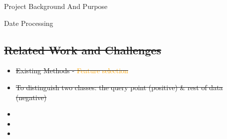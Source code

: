 \documentclass[
 size=14pt,
 paper=smartboard,  %
 mode=present, 		%
 display=slides, 	%
 style=tuliplab,  	%
 pauseslide,
 fleqn,leqno]{powerdot}
\providecommand{\DIFdeltex}[1]{{\protect\color{red}\sout{#1}}}                      %
\providecommand{\DIFdel}[1]{\texorpdfstring{\DIFdeltex{#1}}{}} %
\begin{document}
\begin{slide}
\begin{slide}{Project Background And Purpose}
\begin{slide}{Date Processing}
\begin{note}
\section{\DIFdel{Related Work and Challenges}}
\addtocounter{section}{-1}%

\begin{itemize}%
\item%
\DIFdel{Existing Methods - \textcolor{orange}{Feature selection}
}%

\item%
\DIFdel{To distinguish two classes:
the query point (positive) \& rest of data (negative)
}
\end{itemize}%
\begin{itemize}%
\item%

\item%

\item%


\end{itemize}
\end{note}
\end{slide}
\end{slide}
\end{slide}
\end{document}
